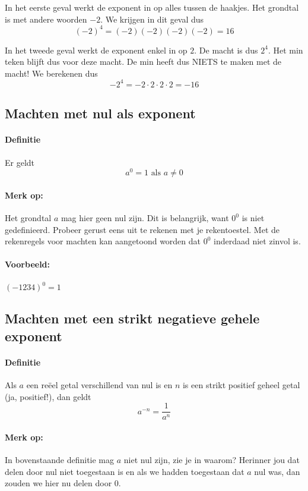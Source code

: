 \documentclass[12pt,twoside]{article}
\begin{document}
In het eerste geval werkt de exponent in op alles tussen de haakjes. Het grondtal is met andere woorden $-2$. We krijgen in dit geval dus
$$(-2)^4=(-2)(-2)(-2)(-2)=16$$

In het tweede geval werkt de exponent enkel in op $2$. De macht is dus $2^4$. Het min teken blijft dus voor deze macht. De min heeft dus NIETS te maken met de macht! We berekenen dus
$$-2^4=- 2 \cdot 2 \cdot 2 \cdot 2 = -16$$

\subsection{Machten met nul als exponent}

\paragraph*{Definitie}
\begin{mdframed}
  Er geldt
  $$a^0 = 1 \text{ als } a \neq 0$$
\end{mdframed}

\paragraph*{Merk op:} Het grondtal $a$ mag hier geen nul zijn. Dit is belangrijk, want $0^0$ is niet gedefinieerd. Probeer gerust eens uit te rekenen met je rekentoestel. Met de rekenregels voor machten kan aangetoond worden dat $0^0$ inderdaad niet zinvol is.

\paragraph*{Voorbeeld:} $\left(-1234\right)^0 = 1$

\subsection{Machten met een strikt negatieve gehele exponent}

\paragraph*{Definitie}
\begin{mdframed}
  Als $a$ een reëel getal verschillend van nul is en $n$ is een strikt positief geheel getal (ja, positief!), dan geldt
  $$a^{-n} = \dfrac{1}{a^n}$$
\end{mdframed}

\paragraph*{Merk op:} In bovenstaande definitie mag $a$ niet nul zijn, zie je in waarom? Herinner jou dat delen door nul niet toegestaan is en als we hadden toegestaan dat $a$ nul was, dan zouden we hier nu delen door 0.
\end{document}
